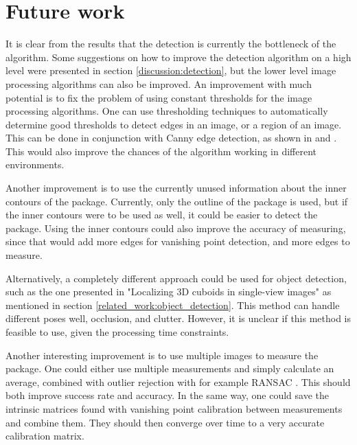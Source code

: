 \section{Future work} \label{discussion:future_work}
It is clear from the results that the detection is currently the bottleneck of the algorithm.
Some suggestions on how to improve the detection algorithm on a high level were presented in section \ref{discussion:detection}, but the lower level image processing algorithms can also be improved.
An improvement with much potential is to fix the problem of using constant thresholds for the image processing algorithms.
One can use thresholding techniques to automatically determine good thresholds to detect edges in an image, or a region of an image.
This can be done in conjunction with Canny edge detection, as shown in \cite{wang2005fast} and \cite{liu2004automated}.
This would also improve the chances of the algorithm working in different environments.

Another improvement is to use the currently unused information about the inner contours of the package.
Currently, only the outline of the package is used, but if the inner contours were to be used as well, it could be easier to detect the package.
Using the inner contours could also improve the accuracy of measuring, since that would add more edges for vanishing point detection, and more edges to measure.

Alternatively, a completely different approach could be used for object detection, such as the one presented in "Localizing 3D cuboids in single-view images" as mentioned in section \ref{related_work:object_detection}.
This method can handle different poses well, occlusion, and clutter.
However, it is unclear if this method is feasible to use, given the processing time constraints.

Another interesting improvement is to use multiple images to measure the package.
One could either use multiple measurements and simply calculate an average, combined with outlier rejection with for example RANSAC \cite{fischler1981random}.
This should both improve success rate and accuracy.
In the same way, one could save the intrinsic matrices found with vanishing point calibration between measurements and combine them.
They should then converge over time to a very accurate calibration matrix. 


